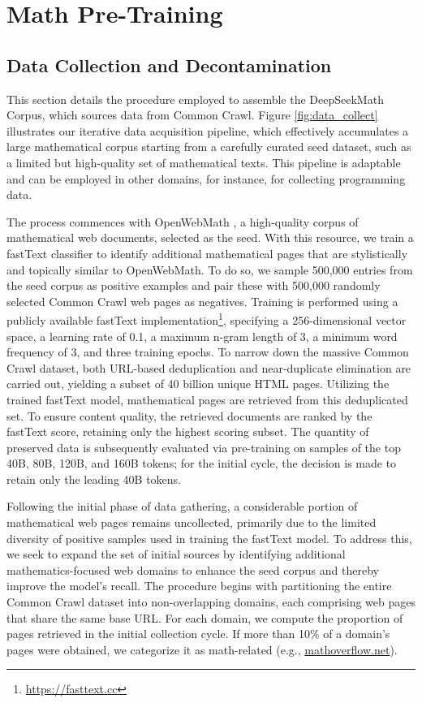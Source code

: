 \section{Math Pre-Training}

\subsection{Data Collection and Decontamination}
This section details the procedure employed to assemble the DeepSeekMath Corpus, which sources data from Common Crawl. Figure \ref{fig:data_collect} illustrates our iterative data acquisition pipeline, which effectively accumulates a large mathematical corpus starting from a carefully curated seed dataset, such as a limited but high-quality set of mathematical texts. This pipeline is adaptable and can be employed in other domains, for instance, for collecting programming data.

The process commences with OpenWebMath \citep{openwebmath}, a high-quality corpus of mathematical web documents, selected as the seed. With this resource, we train a fastText classifier \citep{joulin2016fasttext} to identify additional mathematical pages that are stylistically and topically similar to OpenWebMath. To do so, we sample 500,000 entries from the seed corpus as positive examples and pair these with 500,000 randomly selected Common Crawl web pages as negatives. Training is performed using a publicly available fastText implementation\footnote{\url{https://fasttext.cc}}, specifying a 256-dimensional vector space, a learning rate of 0.1, a maximum n-gram length of 3, a minimum word frequency of 3, and three training epochs. To narrow down the massive Common Crawl dataset, both URL-based deduplication and near-duplicate elimination are carried out, yielding a subset of 40 billion unique HTML pages. Utilizing the trained fastText model, mathematical pages are retrieved from this deduplicated set. To ensure content quality, the retrieved documents are ranked by the fastText score, retaining only the highest scoring subset. The quantity of preserved data is subsequently evaluated via pre-training on samples of the top 40B, 80B, 120B, and 160B tokens; for the initial cycle, the decision is made to retain only the leading 40B tokens.

Following the initial phase of data gathering, a considerable portion of mathematical web pages remains uncollected, primarily due to the limited diversity of positive samples used in training the fastText model. To address this, we seek to expand the set of initial sources by identifying additional mathematics-focused web domains to enhance the seed corpus and thereby improve the model's recall. The procedure begins with partitioning the entire Common Crawl dataset into non-overlapping domains, each comprising web pages that share the same base URL. For each domain, we compute the proportion of pages retrieved in the initial collection cycle. If more than 10\% of a domain’s pages were obtained, we categorize it as math-related (e.g., \url{mathoverflow.net}).

